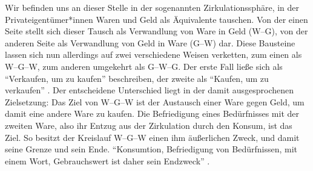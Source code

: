 \documentclass[12pt,
               DIV13,
               paper=a4,
               twoside=false,
               onehalfspacing,
               bibliography=totoc,
               toc=graduated,
               draft,
               ]{scrartcl}
\newcommand{\pc}[2]{\parencite[#1]{#2}}
\newcommand{\vgl}[2]{\parencite[vgl.][#1]{#2}}
\newcommand{\wgw}{W--G--W\xspace}
\begin{document}


Wir befinden uns an dieser Stelle in der sogenannten
Zirkulationssphäre, in der Privateigentümer*innen Waren und Geld als
Äquivalente tauschen. Von der einen Seite stellt sich dieser Tausch
als Verwandlung von Ware in Geld (W--G), von der anderen Seite als
Verwandlung von Geld in Ware (G--W) dar. Diese Bausteine lassen sich
nun allerdings auf zwei verschiedene Weisen verketten, zum einen als
\wgw, zum anderen umgekehrt als G--W--G. Der erste Fall ließe sich als
"`Verkaufen, um zu kaufen"' beschreiben, der zweite als "`Kaufen, um
zu verkaufen"' \vgl{162}{kap}. Der entscheidene Unterschied liegt in
der damit ausgesprochenen Zielsetzung: Das Ziel von \wgw ist der
Austausch einer Ware gegen Geld, um damit eine andere Ware zu kaufen.
Die Befriedigung eines Bedürfnisses mit der zweiten Ware, also ihr
Entzug aus der Zirkulation durch den Konsum, ist das Ziel. So besitzt
der Kreislauf \wgw einen ihm äußerlichen Zweck, und damit seine Grenze
und sein Ende. "`Konsumtion, Befriedigung von Bedürfnissen, mit einem
Wort, Gebrauchswert ist daher sein Endzweck"' \pc{164}{kap}.

\end{document}
